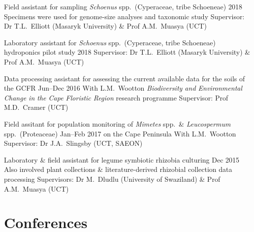 \documentclass[10pt]{article}
\begin{document}
\begin{hangparas}{2em}{1}

Field assistant for sampling \textit{Schoenus} spp.~(Cyperaceae, tribe 
Schoeneae)                                                    \hfill 2018 \break
Specimens were used for genome-size analyses and taxonomic study          \break
Supervisor: Dr T.L.~Elliott (Masaryk University) \& Prof A.M.~Muasya (UCT)

Laboratory assistant for \textit{Schoenus} spp.~(Cyperaceae, tribe Schoeneae) 
hydroponics pilot study                                       \hfill 2018 \break
Supervisor: Dr T.L.~Elliott (Masaryk University) \& Prof A.M.~Muasya (UCT)

Data processing assistant for assessing the current available data for the 
soils of the GCFR                                    \hfill Jun--Dec 2016 \break
With L.M.~Wootton                                                         \break
\textit{Biodiversity and Environmental Change in the Cape Floristic Region} 
research programme                                                        \break
Supervisor: Prof M.D.~Cramer (UCT)

Field assitant for population monitoring of
  \textit{Mimetes} spp.~\&
  \textit{Leucospermum} spp.~(Proteaceae)            \hfill Jan--Feb 2017 \break
  on the Cape Peninsula                                                   \break
With L.M.~Wootton                                                         \break
Supervisor: Dr J.A.~Slingsby (UCT, SAEON)

Laboratory \& field assistant for legume symbiotic rhizobia culturing
                                                          \hfill Dec 2015 \break
Also involved plant collections \& literature-derived rhizobial collection 
data processing                                                           \break
Supervisors: Dr M.~Dludlu (University of Swaziland) \& Prof A.M.~Muasya (UCT)


\hfill

\end{hangparas}

\clearpage %

\section*{Conferences} %
\end{document}
